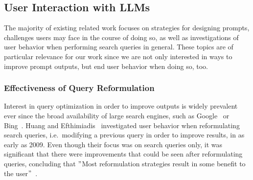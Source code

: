 
\subsection{User Interaction with LLMs}
\label{subsec:user-interaction-with-llms}
The majority of existing related work focuses on strategies for designing prompts,
challenges users may face in the course of doing so, as well as investigations of user behavior when
performing search queries in general.
These topics are of particular relevance for our work since we are not only interested in ways to
improve prompt outputs, but end user behavior when doing so, too.


\subsubsection{Effectiveness of Query Reformulation}
Interest in query optimization in order to improve outputs is widely prevalent ever since the broad
availability of large search engines, such as Google~\cite{google_google_2023} or Bing~\cite{microsoft_bing_2023}.
Huang and Efthimiadis~\cite{huang_analyzing_2009} investigated user behavior when reformulating search
queries, i.e.\ modifying a previous query in order to improve results, in as early as 2009.
Even though their focus was on search queries only, it was significant that there were improvements
that could be seen after reformulating queries, concluding that
\("\)Most reformulation strategies result in some benefit to the user\("\)~\cite[p. 1]{huang_analyzing_2009}.


